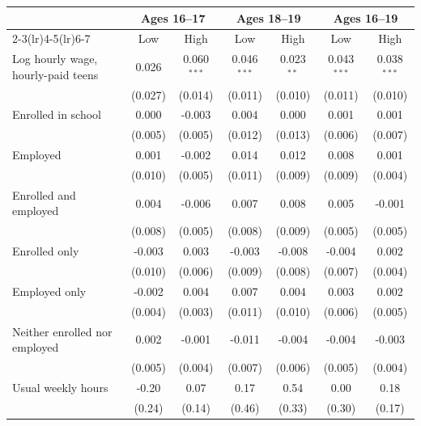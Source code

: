 \begin{tabular}{lcccccc}
\toprule
 & \multicolumn{2}{c}{Ages 16--17} & \multicolumn{2}{c}{Ages 18--19} & \multicolumn{2}{c}{Ages 16--19} \\
\cmidrule(lr){2-3}\cmidrule(lr){4-5}\cmidrule(lr){6-7}
 & Low & High & Low & High & Low & High \\
\midrule
Log hourly wage, hourly-paid teens & 0.026 & 0.060$^{***}$ & 0.046$^{***}$ & 0.023$^{**}$ & 0.043$^{***}$ & 0.038$^{***}$ \\
 & (0.027) & (0.014) & (0.011) & (0.010) & (0.011) & (0.010) \\
Enrolled in school & 0.000 & -0.003 & 0.004 & 0.000 & 0.001 & 0.001 \\
 & (0.005) & (0.005) & (0.012) & (0.013) & (0.006) & (0.007) \\
Employed & 0.001 & -0.002 & 0.014 & 0.012 & 0.008 & 0.001 \\
 & (0.010) & (0.005) & (0.011) & (0.009) & (0.009) & (0.004) \\
Enrolled and employed & 0.004 & -0.006 & 0.007 & 0.008 & 0.005 & -0.001 \\
 & (0.008) & (0.005) & (0.008) & (0.009) & (0.005) & (0.005) \\
Enrolled only & -0.003 & 0.003 & -0.003 & -0.008 & -0.004 & 0.002 \\
 & (0.010) & (0.006) & (0.009) & (0.008) & (0.007) & (0.004) \\
Employed only & -0.002 & 0.004 & 0.007 & 0.004 & 0.003 & 0.002 \\
 & (0.004) & (0.003) & (0.011) & (0.010) & (0.006) & (0.005) \\
Neither enrolled nor employed & 0.002 & -0.001 & -0.011 & -0.004 & -0.004 & -0.003 \\
 & (0.005) & (0.004) & (0.007) & (0.006) & (0.005) & (0.004) \\
Usual weekly hours & -0.20 & 0.07 & 0.17 & 0.54 & 0.00 & 0.18 \\
 & (0.24) & (0.14) & (0.46) & (0.33) & (0.30) & (0.17) \\
\bottomrule
\end{tabular}

